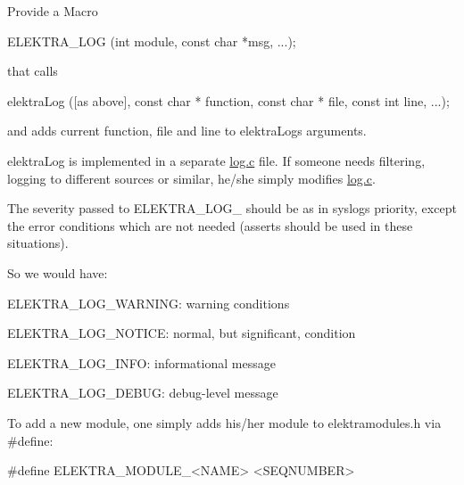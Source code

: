 Provide a Macro


\begin{DoxyCode}
ELEKTRA\_LOG (\textcolor{keywordtype}{int} module, \textcolor{keyword}{const} \textcolor{keywordtype}{char} *msg, ...);
\end{DoxyCode}


that calls


\begin{DoxyCode}
elektraLog ([as above], \textcolor{keyword}{const} \textcolor{keywordtype}{char} * \textcolor{keyword}{function}, \textcolor{keyword}{const} \textcolor{keywordtype}{char} * file,
            \textcolor{keyword}{const} \textcolor{keywordtype}{int} line, ...);
\end{DoxyCode}


and adds current function, file and line to {\ttfamily elektra\+Log}\textquotesingle{}s arguments.

{\ttfamily elektra\+Log} is implemented in a separate {\ttfamily \hyperlink{log_8c}{log.\+c}} file. If someone needs filtering, logging to different sources or similar, he/she simply modifies {\ttfamily \hyperlink{log_8c}{log.\+c}}.

The severity passed to {\ttfamily E\+L\+E\+K\+T\+R\+A\+\_\+\+L\+O\+G\+\_\+} should be as in syslog\textquotesingle{}s priority, except the error conditions which are not needed (asserts should be used in these situations).

So we would have\+:


\begin{DoxyItemize}
\item {\ttfamily E\+L\+E\+K\+T\+R\+A\+\_\+\+L\+O\+G\+\_\+\+W\+A\+R\+N\+I\+NG}\+: warning conditions
\item {\ttfamily E\+L\+E\+K\+T\+R\+A\+\_\+\+L\+O\+G\+\_\+\+N\+O\+T\+I\+CE}\+: normal, but significant, condition
\item {\ttfamily E\+L\+E\+K\+T\+R\+A\+\_\+\+L\+O\+G\+\_\+\+I\+N\+FO}\+: informational message
\item {\ttfamily E\+L\+E\+K\+T\+R\+A\+\_\+\+L\+O\+G\+\_\+\+D\+E\+B\+UG}\+: debug-\/level message
\end{DoxyItemize}

To add a new module, one simply adds his/her module to {\ttfamily elektramodules.\+h} via {\ttfamily \#define}\+:


\begin{DoxyCode}
\textcolor{preprocessor}{#define ELEKTRA\_MODULE\_<NAME> <SEQNUMBER>}
\end{DoxyCode}


